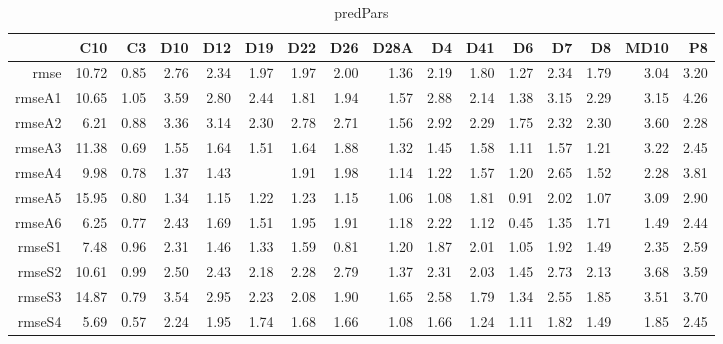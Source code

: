 \begin{table}[H]
\centering
\begin{tabular}{rrrrrrrrrrrrrrrr}
  \hline
 & C10 & C3 & D10 & D12 & D19 & D22 & D26 & D28A & D4 & D41 & D6 & D7 & D8 & MD10 & P8 \\ 
  \hline
rmse & 10.72 & 0.85 & 2.76 & 2.34 & 1.97 & 1.97 & 2.00 & 1.36 & 2.19 & 1.80 & 1.27 & 2.34 & 1.79 & 3.04 & 3.20 \\ 
  rmseA1 & 10.65 & 1.05 & 3.59 & 2.80 & 2.44 & 1.81 & 1.94 & 1.57 & 2.88 & 2.14 & 1.38 & 3.15 & 2.29 & 3.15 & 4.26 \\ 
  rmseA2 & 6.21 & 0.88 & 3.36 & 3.14 & 2.30 & 2.78 & 2.71 & 1.56 & 2.92 & 2.29 & 1.75 & 2.32 & 2.30 & 3.60 & 2.28 \\ 
  rmseA3 & 11.38 & 0.69 & 1.55 & 1.64 & 1.51 & 1.64 & 1.88 & 1.32 & 1.45 & 1.58 & 1.11 & 1.57 & 1.21 & 3.22 & 2.45 \\ 
  rmseA4 & 9.98 & 0.78 & 1.37 & 1.43 &  & 1.91 & 1.98 & 1.14 & 1.22 & 1.57 & 1.20 & 2.65 & 1.52 & 2.28 & 3.81 \\ 
  rmseA5 & 15.95 & 0.80 & 1.34 & 1.15 & 1.22 & 1.23 & 1.15 & 1.06 & 1.08 & 1.81 & 0.91 & 2.02 & 1.07 & 3.09 & 2.90 \\ 
  rmseA6 & 6.25 & 0.77 & 2.43 & 1.69 & 1.51 & 1.95 & 1.91 & 1.18 & 2.22 & 1.12 & 0.45 & 1.35 & 1.71 & 1.49 & 2.44 \\ 
  rmseS1 & 7.48 & 0.96 & 2.31 & 1.46 & 1.33 & 1.59 & 0.81 & 1.20 & 1.87 & 2.01 & 1.05 & 1.92 & 1.49 & 2.35 & 2.59 \\ 
  rmseS2 & 10.61 & 0.99 & 2.50 & 2.43 & 2.18 & 2.28 & 2.79 & 1.37 & 2.31 & 2.03 & 1.45 & 2.73 & 2.13 & 3.68 & 3.59 \\ 
  rmseS3 & 14.87 & 0.79 & 3.54 & 2.95 & 2.23 & 2.08 & 1.90 & 1.65 & 2.58 & 1.79 & 1.34 & 2.55 & 1.85 & 3.51 & 3.70 \\ 
  rmseS4 & 5.69 & 0.57 & 2.24 & 1.95 & 1.74 & 1.68 & 1.66 & 1.08 & 1.66 & 1.24 & 1.11 & 1.82 & 1.49 & 1.85 & 2.45 \\ 
   \hline
\end{tabular}
\caption{predPars} 
\end{table}

